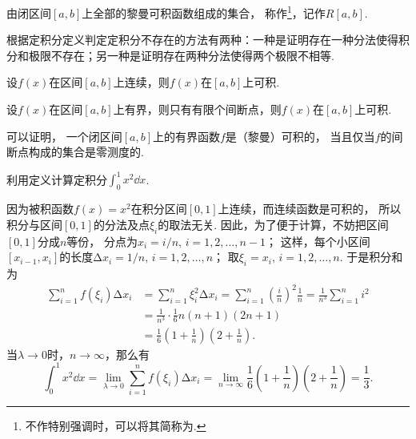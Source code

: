 \begin{definition}\label{definition:函数族.黎曼可积函数族}
由闭区间\([a,b]\)上全部的黎曼可积函数组成的集合，
称作\footnote{%
不作特别强调时，可以将其简称为.%
}，记作\(R[a,b]\).
\end{definition}

\begin{example}[用定义法证明定积分不存在]
根据定积分定义判定定积分不存在的方法有两种：一种是证明存在一种分法使得积分和极限不存在；另一种是证明存在两种分法使得两个极限不相等.
\end{example}

\begin{theorem}[函数可积的充分条件I]
设\(f(x)\)在区间\([a,b]\)上连续，则\(f(x)\)在\([a,b]\)上可积.
\end{theorem}

\begin{theorem}[函数可积的充分条件II]
设\(f(x)\)在区间\([a,b]\)上有界，则只有有限个间断点，则\(f(x)\)在\([a,b]\)上可积.
\end{theorem}

\begin{remark}
可以证明，
一个闭区间\([a,b]\)上的有界函数\(f\)是（黎曼）可积的，
当且仅当\(f\)的间断点构成的集合是零测度的.
\end{remark}

\begin{example}
利用定义计算定积分\(\int_0^1 x^2 \dd{x}\).
\begin{solution}
因为被积函数\(f(x) = x^2\)在积分区间\([0,1]\)上连续，而连续函数是可积的，
所以积分与区间\([0,1]\)的分法及点\(\xi_i\)的取法无关.
因此，为了便于计算，不妨把区间\([0,1]\)分成\(n\)等份，
分点为\(x_i = i/n,\,i=1,2,\dotsc,n-1\)；
这样，每个小区间\([x_{i-1},x_i]\)的长度\(\increment x_i = 1/n,\,i=1,2,\dotsc,n\)；
取\(\xi_i=x_i,\,i=1,2,\dotsc,n\).
于是积分和为\begin{align*}
	\sum_{i=1}^n f(\xi_i) \increment x_i
	&= \sum_{i=1}^n \xi_i^2 \increment x_i
	= \sum_{i=1}^n \left(\frac{i}{n}\right)^2 \frac{1}{n}
	= \frac{1}{n^3} \sum_{i=1}^n i^2 \\
	&= \frac{1}{n^3} \cdot \frac{1}{6} n(n+1)(2n+1) \\
	&= \frac{1}{6} \left(1+\frac{1}{n}\right) \left(2+\frac{1}{n}\right).
\end{align*}
当\(\lambda\to0\)时，\(n\to\infty\)，那么有\[
	\int_0^1 x^2 \dd{x}
	= \lim_{\lambda\to0} \sum_{i=1}^n f(\xi_i) \increment x_i
	= \lim_{n\to\infty}
		\frac{1}{6} \left(1+\frac{1}{n}\right) \left(2+\frac{1}{n}\right)
	= \frac{1}{3}.
\]
\end{solution}
\end{example}

